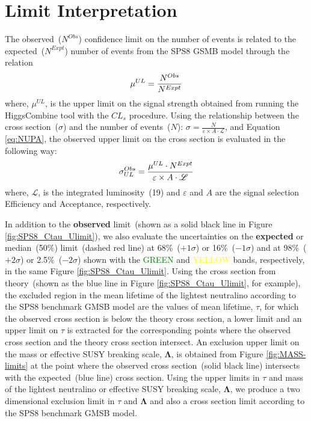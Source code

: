 \chapter{Limit Interpretation}
\label{Limit_Results_and_Intepretation_Chapter}
The observed~($N^{Obs}$) confidence limit on the number of events is related to the expected~($N^{Expt}$) number of events from the SPS8 GSMB model through the relation
\begin{equation}{\label{eq:NUPA}}
 \mu^{UL} = \frac {N^{Obs}}{N^{Expt}}
\end{equation}
where, $\mu^{UL}$, is the upper limit on the signal strength obtained from running the HiggsCombine tool  with the $CL_{s}$ procedure.
Using the relationship between the cross section~($\sigma$) and the number of events~($N$): $\sigma = \frac{N}{\varepsilon\times A \cdot \mathscr{L}}$, and Equation \ref{eq:NUPA}, the observed upper limit on the cross section is evaluated in the following way:
\begin{equation}{\label{eq:SIGMAUPA}}
\sigma^{Obs}_{UL} = \frac{\mu^{UL} \cdot N^{Expt}}{\varepsilon\times A\cdot \mathscr{L}}
\end{equation}
where, $\mathscr{L}$, is the integrated luminosity~(19\fbinv) and $\varepsilon$ and $A$ are the signal selection Efficiency and Acceptance, respectively.
\par 
In addition to the \textbf{observed} limit~(shown as a solid black line in Figure \ref{fig:SPS8_Ctau_Ulimit}), we also evaluate the uncertainties on the \textbf{expected} or median~(50\%) limit~(dashed red line) at 68\%~($+ 1\sigma$) or 16\%~($- 1\sigma$) and at 98\%~($+ 2\sigma$) or 2.5\%~($- 2\sigma$) shown with the \textcolor{green}{GREEN} and \textcolor{yellow}{YELLOW}  bands, respectively, in the same Figure \ref{fig:SPS8_Ctau_Ulimit}.
\newline
Using the cross section from theory~(shown as the blue line in Figure \ref{fig:SPS8_Ctau_Ulimit}, for example), the excluded region in the mean lifetime of the lightest neutralino according to the SPS8 benchmark GMSB model are the values of mean lifetime, $\tau$, for which the observed cross section is below the theory cross section, \ie a lower limit and an upper limit on $\tau$ is extracted for the corresponding points where the observed cross section and the theory cross section intersect.
An exclusion  upper limit on the mass or effective SUSY breaking scale, $\mathbf{\Lambda}$, is obtained from Figure \ref{fig:MASS-limits} at the point where the observed cross section~(solid black line) intersects with the expected~(blue line) cross section. 
\newline
Using  the upper limits in $\tau$ and mass of the lightest neutralino or effective SUSY breaking scale, $\mathbf{\Lambda}$, we produce a two dimensional exclusion limit in $\tau$ and $\mathbf{\Lambda}$ and also a cross section limit according to the SPS8 benchmark GMSB model. 

